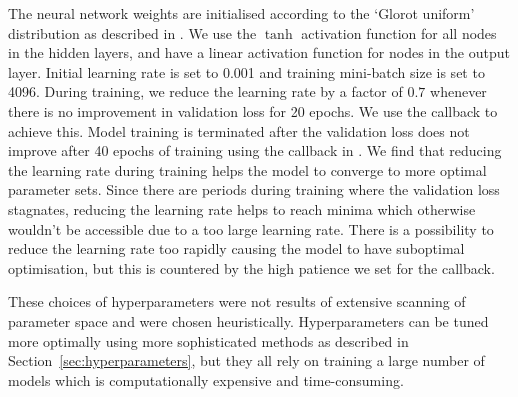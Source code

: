 \documentclass[main.tex]{subfiles}
\begin{document}
The neural network weights are initialised according to the `Glorot uniform' distribution as described in \cite{pmlr-v9-glorot10a}.
We use the $\tanh$ activation function for all nodes in the hidden layers, and have a linear activation function for nodes in the output layer.
Initial learning rate is set to 0.001 and training mini-batch size is set to 4096.
During training, we reduce the learning rate by a factor of $0.7$ whenever there is no improvement in validation loss for 20 epochs.
We use the {\Keras} callback {\ReduceLROnPlateau} to achieve this.
Model training is terminated after the validation loss does not improve after 40 epochs of training using the {\EarlyStopping} callback in {\Keras}.
We find that reducing the learning rate during training helps the model to converge to more optimal parameter sets.
Since there are periods during training where the validation loss stagnates, reducing the learning rate helps to reach minima which otherwise wouldn't be accessible due to a too large learning rate.
There is a possibility to reduce the learning rate too rapidly causing the model to have suboptimal optimisation, but this is countered by the high patience we set for the {\ReduceLROnPlateau} callback.

These choices of hyperparameters were not results of extensive scanning of parameter space and were chosen heuristically.
Hyperparameters can be tuned more optimally using more sophisticated methods as described in Section~\ref{sec:hyperparameters}, but they all rely on training a large number of models which is computationally expensive and time-consuming.
\end{document}
